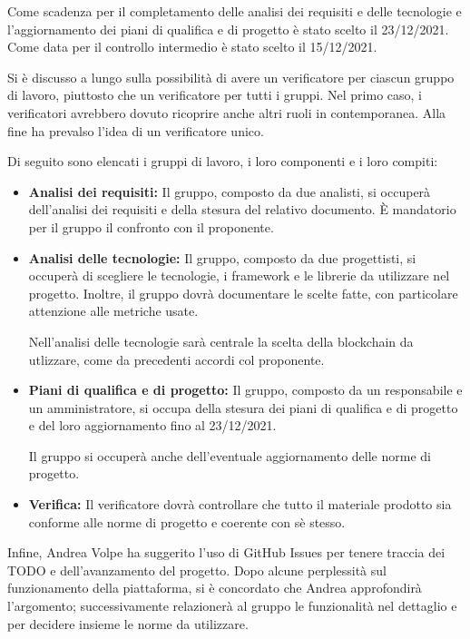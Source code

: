 \documentclass[a4paper, 12pt]{article}
\begin{document}
Come scadenza per il completamento delle analisi dei requisiti e delle tecnologie e l'aggiornamento dei piani di qualifica e di progetto è stato scelto il 23/12/2021. Come data per il controllo intermedio è stato scelto il 15/12/2021.

Si è discusso a lungo sulla possibilità di avere un verificatore per ciascun gruppo di lavoro, piuttosto che un verificatore per tutti i gruppi. Nel primo caso, i verificatori avrebbero dovuto ricoprire anche altri ruoli in contemporanea. Alla fine ha prevalso l'idea di un verificatore unico.

Di seguito sono elencati i gruppi di lavoro, i loro componenti e i loro compiti:
\begin{itemize}
\item \textbf{Analisi dei requisiti:}
Il gruppo, composto da due analisti, si occuperà dell'analisi dei requisiti e della stesura del relativo documento. È mandatorio per il gruppo il confronto con il proponente.

\item \textbf{Analisi delle tecnologie:}
Il gruppo, composto da due progettisti, si occuperà di scegliere le tecnologie, i framework e le librerie da utilizzare nel progetto. Inoltre, il gruppo dovrà documentare le scelte fatte, con particolare attenzione alle metriche usate.

Nell'analisi delle tecnologie sarà centrale la scelta della blockchain da utlizzare, come da precedenti accordi col proponente.

\item \textbf{Piani di qualifica e di progetto:}
Il gruppo, composto da un responsabile e un amministratore, si occupa della stesura dei piani di qualifica e di progetto e del loro aggiornamento fino al 23/12/2021.

Il gruppo si occuperà anche dell'eventuale aggiornamento delle norme di progetto.

\item \textbf{Verifica:}
Il verificatore dovrà controllare che tutto il materiale prodotto sia conforme alle norme di progetto e coerente con sè stesso.
\end{itemize}

Infine, Andrea Volpe ha suggerito l'uso di GitHub Issues per tenere traccia dei TODO e dell'avanzamento del progetto. Dopo alcune perplessità sul funzionamento della piattaforma, si è concordato che Andrea approfondirà l'argomento; successivamente relazionerà al gruppo le funzionalità nel dettaglio e per decidere insieme le norme da utilizzare.
\end{document}
